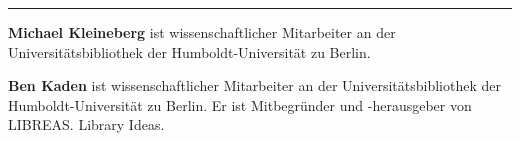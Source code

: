 \begin{center}\rule{0.5\linewidth}{\linethickness}\end{center}

\textbf{Michael Kleineberg} ist wissenschaftlicher Mitarbeiter an der
Universitätsbibliothek der Humboldt-Universität zu Berlin.

\textbf{Ben Kaden} ist wissenschaftlicher Mitarbeiter an der
Universitätsbibliothek der Hum\-boldt-Uni\-ver\-si\-tät zu Berlin. Er ist
Mitbegründer und -herausgeber von LIBREAS. Library Ideas.
